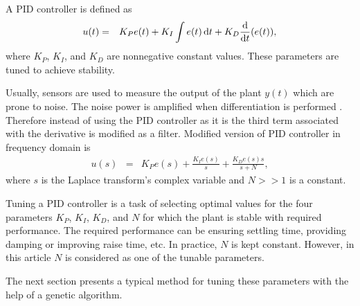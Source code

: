 \documentclass[conference, a4paper, final]{IEEEtran} %
\begin{document}
\par
A PID controller is defined as
\begin{eqnarray}
    u(t) &=& K_Pe(t) + K_I\int{e(t)\dd{t}} + K_D\dv{t}(e(t)), \label{Eqn:PIDDefinition}
\end{eqnarray}
where $K_P$, $K_I$, and $K_D$ are nonnegative constant values. These parameters are tuned to achieve stability.
\par
Usually, sensors are used to measure the output of the plant $y(t)$ which are prone to noise. The noise power is amplified when differentiation is performed \cite{mathworks2017}. Therefore instead of using the PID controller as it is the third term associated with the derivative is modified as a filter. Modified version of PID controller in frequency domain is
\begin{eqnarray}
    u(s) &=& K_Pe(s) + \frac{K_Ie(s)}{s} + \frac{K_De(s)s}{s+N}, \label{Eqn:ModifiedPIDDefinition}
\end{eqnarray}
where $s$ is the Laplace transform's complex variable and $N>>1$ is a constant.
\par
Tuning a PID controller is a task of selecting optimal values for the four parameters $K_P$, $K_I$, $K_D$, and $N$ for which the plant is stable with required performance. The required performance can be ensuring settling time, providing damping or improving raise time, etc. In practice, $N$ is kept constant. However, in this article $N$ is considered as one of the tunable parameters.
\par
The next section presents a typical method for tuning these parameters with the help of a genetic algorithm.
\end{document}
